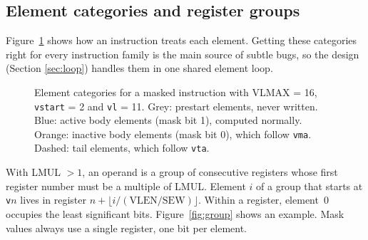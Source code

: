\documentclass[11pt]{article}
\begin{document}
\subsection{Element categories and register groups}

Figure~\ref{fig:elements} shows how an instruction treats each element. Getting these categories
right for every instruction family is the main source of subtle bugs, so the design (Section
\ref{sec:loop}) handles them in one shared element loop.

\begin{figure}[htbp]
\centering
{}
\caption{Element categories for a masked instruction with VLMAX = 16, \texttt{vstart} = 2 and
\texttt{vl} = 11. Grey: prestart elements, never written. Blue: active body elements (mask bit 1),
computed normally. Orange: inactive body elements (mask bit 0), which follow \texttt{vma}. Dashed:
tail elements, which follow \texttt{vta}.}\label{fig:elements}
\end{figure}

With LMUL $>1$, an operand is a group of consecutive registers whose first register number must be
a multiple of LMUL. Element $i$ of a group that starts at \texttt{v}$n$ lives in register
$n + \lfloor i/(\mathrm{VLEN}/\mathrm{SEW})\rfloor$. Within a register, element~0 occupies the least
significant bits. Figure~\ref{fig:group} shows an example. Mask values always use a single register,
one bit per element.
\end{document}
